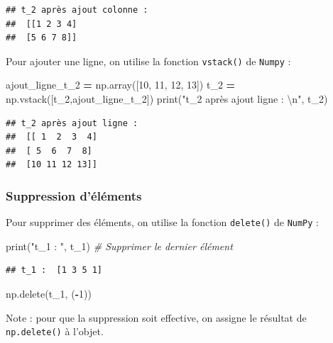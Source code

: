 \documentclass[12pt,]{book}
\newenvironment{Shaded}{\begin{snugshade}}{\end{snugshade}}
\newcommand{\DecValTok}[1]{\textcolor[rgb]{0.00,0.00,0.81}{#1}}
\newcommand{\CharTok}[1]{\textcolor[rgb]{0.31,0.60,0.02}{#1}}
\newcommand{\StringTok}[1]{\textcolor[rgb]{0.31,0.60,0.02}{#1}}
\newcommand{\CommentTok}[1]{\textcolor[rgb]{0.56,0.35,0.01}{\textit{#1}}}
\newcommand{\OperatorTok}[1]{\textcolor[rgb]{0.81,0.36,0.00}{\textbf{#1}}}
\newcommand{\BuiltInTok}[1]{#1}
\newcommand{\NormalTok}[1]{#1}
\numberwithin{equation}{section}
\numberwithin{countremarque}{section}
\begin{document}
\begin{lstlisting}
## t_2 après ajout colonne : 
##  [[1 2 3 4]
##  [5 6 7 8]]
\end{lstlisting}

Pour ajouter une ligne, on utilise la fonction \texttt{vstack()} de
\texttt{Numpy} :

\begin{Shaded}
\begin{Highlighting}[]
\NormalTok{ajout_ligne_t_2 }\OperatorTok{=}\NormalTok{ np.array([}\DecValTok{10}\NormalTok{, }\DecValTok{11}\NormalTok{, }\DecValTok{12}\NormalTok{, }\DecValTok{13}\NormalTok{])}
\NormalTok{t_2 }\OperatorTok{=}\NormalTok{ np.vstack([t_2,ajout_ligne_t_2])}
\BuiltInTok{print}\NormalTok{(}\StringTok{"t_2 après ajout ligne : }\CharTok{\textbackslash{}n}\StringTok{"}\NormalTok{, t_2)}
\end{Highlighting}
\end{Shaded}

\begin{lstlisting}
## t_2 après ajout ligne : 
##  [[ 1  2  3  4]
##  [ 5  6  7  8]
##  [10 11 12 13]]
\end{lstlisting}

\subsubsection{Suppression d'éléments}\label{suppression-delements-2}

Pour supprimer des éléments, on utilise la fonction \texttt{delete()} de
\texttt{NumPy} :

\begin{Shaded}
\begin{Highlighting}[]
\BuiltInTok{print}\NormalTok{(}\StringTok{"t_1 : "}\NormalTok{, t_1)}
\CommentTok{# Supprimer le dernier élément}
\end{Highlighting}
\end{Shaded}

\begin{lstlisting}
## t_1 :  [1 3 5 1]
\end{lstlisting}

\begin{Shaded}
\begin{Highlighting}[]
\NormalTok{np.delete(t_1, (}\OperatorTok{-}\DecValTok{1}\NormalTok{))}
\end{Highlighting}
\end{Shaded}

Note : pour que la suppression soit effective, on assigne le résultat de
\texttt{np.delete()} à l'objet.
\end{document}

